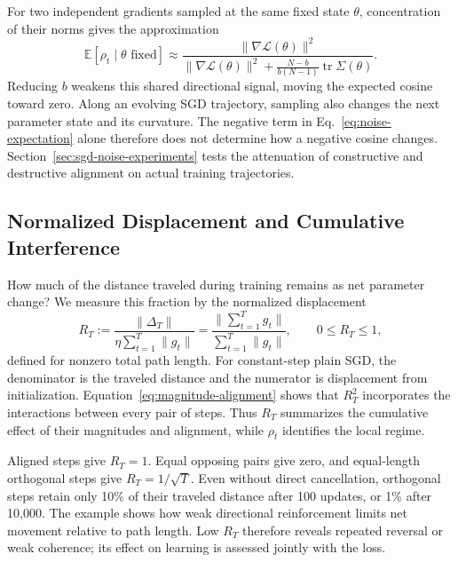 For two independent gradients sampled at the same fixed state $\theta$,
concentration of their norms gives the approximation
\begin{equation}
  \mathbb E[\rho_t\mid\theta\text{ fixed}]\approx
  \frac{\|\nabla\mathcal L(\theta)\|^2}
  {\|\nabla\mathcal L(\theta)\|^2+
   \frac{N-b}{b(N-1)}\operatorname{tr}\Sigma(\theta)}.
  \label{eq:noise-cosine-approx}
\end{equation}
Reducing $b$ weakens this shared directional signal, moving the expected
cosine toward zero. Along an evolving SGD trajectory, sampling also
changes the next parameter state and its curvature. The negative term
in Eq.~\eqref{eq:noise-expectation} alone therefore does not determine
how a negative cosine changes. Section~\ref{sec:sgd-noise-experiments}
tests the attenuation of constructive and destructive alignment on
actual training trajectories.

\subsection{Normalized Displacement and Cumulative Interference}
\label{subsec:normalized-displacement}

How much of the distance traveled during training remains as net
parameter change? We measure this fraction by the normalized displacement
\begin{equation}
  R_T:=
  \frac{\|\Delta_T\|}
       {\eta\sum_{t=1}^T\|g_t\|}
  =\frac{\|\sum_{t=1}^T g_t\|}
        {\sum_{t=1}^T\|g_t\|},
  \qquad 0\leq R_T\leq1,
  \label{eq:normalized-displacement}
\end{equation}
defined for nonzero total path length. For constant-step plain SGD, the
denominator is the traveled distance and the numerator is displacement
from initialization. Equation~\eqref{eq:magnitude-alignment} shows that
$R_T^2$ incorporates the interactions between every pair of steps.
Thus $R_T$ summarizes the cumulative effect of their magnitudes and
alignment, while $\rho_t$ identifies the local regime.

Aligned steps give $R_T=1$. Equal opposing pairs give zero, and
equal-length orthogonal steps give $R_T=1/\sqrt T$. Even without direct
cancellation, orthogonal steps retain only 10\% of their traveled
distance after 100 updates, or 1\% after 10,000. The example shows how
weak directional reinforcement limits net movement relative to path
length. Low $R_T$ therefore reveals repeated reversal or weak coherence;
its effect on learning is assessed jointly with the loss.

